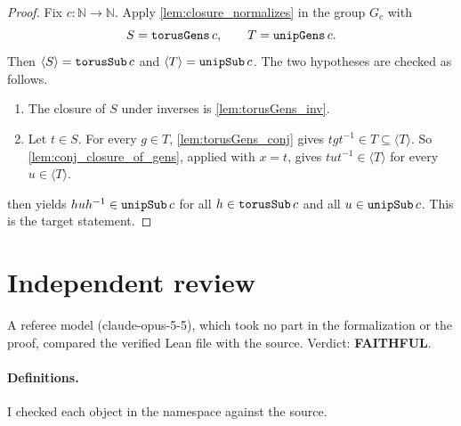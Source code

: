\documentclass[11pt]{article}
\theoremstyle{definition}
\theoremstyle{remark}
\newcommand{\leanname}[1]{\texttt{\detokenize{#1}}}
\begin{document}
\begin{proof}
Fix $c\colon\mathbb{N}\to\mathbb{N}$. Apply \cref{lem:closure_normalizes} in the group $G_c$ with
\[
S=\leanname{torusGens}\,c,\qquad T=\leanname{unipGens}\,c.
\]
Then $\langle S\rangle=\leanname{torusSub}\,c$ and $\langle T\rangle=\leanname{unipSub}\,c$. The two hypotheses are checked as follows.
\begin{enumerate}
\item The closure of $S$ under inverses is \cref{lem:torusGens_inv}.
\item Let $t\in S$. For every $g\in T$, \cref{lem:torusGens_conj} gives $tgt^{-1}\in T\subseteq\langle T\rangle$. So \cref{lem:conj_closure_of_gens}, applied with $x=t$, gives $tut^{-1}\in\langle T\rangle$ for every $u\in\langle T\rangle$.
\end{enumerate}
 then yields $huh^{-1}\in\leanname{unipSub}\,c$ for all $h\in\leanname{torusSub}\,c$ and all $u\in\leanname{unipSub}\,c$. This is the target statement.
\end{proof}

\section{Independent review}

A referee model (claude-opus-5-5), which took no part in the formalization or the proof, compared the verified Lean file with the source. Verdict: \textbf{FAITHFUL}.

\paragraph{Definitions.} I checked each object in the \leanname{GM} namespace against the source.
\end{document}
